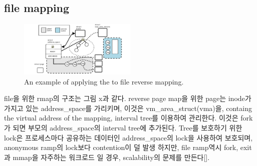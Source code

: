 


\subsection{file mapping}

\begin{figure}[tb]
  \begin{center}
     \includegraphics[width=0.5\textwidth,height=0.5\textheight,keepaspectratio]{fig/file_rmap}
  \end{center}
  \caption{An example of applying the  to file reverse mapping. }
  \label{fig:deferu}
\end{figure}


file을 위한 rmap의 구조는 그림 x과 같다. reverse page map을 위한 page는 inode가 가지고 있는
address\_space를 가리키며, 이것은 vm\_area\_struct(vma)을, containg the virtual address
of the mapping, interval tree를 이용하여 관리한다. 이것은 fork가 되면 부모의 address\_space의
interval tree에 추가된다.
Tree를 보호하기 위한 lock은 프로세스마다 공유하는 데이터인 address\_space의 lock을 사용하여
보호되며, anonymous ramp의 lock보다 contention이 덜 발생 하지만, file ramp역시 fork, exit과
mmap을 자주하는 워크로드 일 경우, scalability의 문제를 만든다[]. 

